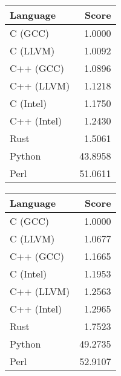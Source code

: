 \begin{subtable}{0.33\textwidth}
    \centering
    \caption{$k=1$}
    \label{table:runtime:dfa_gap(1)}
    \begin{tabular}{|l|r|}
        \hline
        Language & Score \\
        \hline
        C (GCC) & 1.0000 \\
        C (LLVM) & 1.0092 \\
        C++ (GCC) & 1.0896 \\
        C++ (LLVM) & 1.1218 \\
        C (Intel) & 1.1750 \\
        C++ (Intel) & 1.2430 \\
        Rust & 1.5061 \\
        Python & 43.8958 \\
        Perl & 51.0611 \\
        \hline
    \end{tabular}
\end{subtable}%
\begin{subtable}{0.33\textwidth}
    \centering
    \caption{$k=2$}
    \label{table:runtime:dfa_gap(2)}
    \begin{tabular}{|l|r|}
        \hline
        Language & Score \\
        \hline
        C (GCC) & 1.0000 \\
        C (LLVM) & 1.0677 \\
        C++ (GCC) & 1.1665 \\
        C (Intel) & 1.1953 \\
        C++ (LLVM) & 1.2563 \\
        C++ (Intel) & 1.2965 \\
        Rust & 1.7523 \\
        Python & 49.2735 \\
        Perl & 52.9107 \\
        \hline
    \end{tabular}
\end{subtable}%
